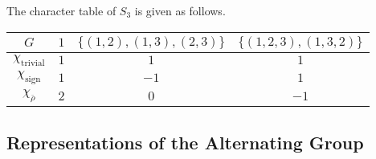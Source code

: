 \documentclass[a4paper]{article}
\begin{document}
\begin{thm}{}{} The character table of $S_3$ is given as follows. 
\begin{center}
\begin{tabular}{ c|ccc } 
$G$ & $1$ & $\{(1,2),(1,3),(2,3)\}$ & $\{(1,2,3),(1,3,2)\}$ \\\hline
$\chi_{\text{trivial}}$ & $1$ & $1$ & $1$ \\
$\chi_{\text{sign}}$ & $1$ & $-1$ & $1$ \\
$\chi_{\overline{\rho}}$ & $2$ & $0$ & $-1$ \\
\end{tabular}
\end{center}
\end{thm}


\subsection{Representations of the Alternating Group}
\end{document}
